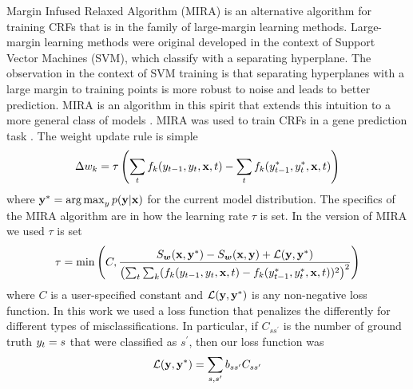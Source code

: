 Margin Infused Relaxed Algorithm (MIRA) is an alternative algorithm for training CRFs that is in the family of large-margin learning methods. Large-margin learning methods were original developed in the context of Support Vector Machines (SVM), which classify with a separating hyperplane. The observation in the context of SVM training is that separating hyperplanes with a large margin to training points is more robust to noise and leads to better prediction. MIRA is an algorithm in this spirit that extends this intuition to a more general class of models \citep{crammerThesis}. MIRA was used to train CRFs in a gene prediction task \citep{bernal2007}. The weight update rule is simple
\begin{align*}
\Delta w_k = \tau \left(\sum_{t} f_k(y_{t-1}, y_{t}, \mathbf{x}, t) - \sum_{t} f_k(y^*_{t-1}, y^*_{t}, \mathbf{x}, t)\right)
\end{align*}
where $\mathbf{y}^* = \operatorname*{arg\,max}_{y} p(\mathbf{y}|\mathbf{x})$ for the current model distribution. The specifics of the MIRA algorithm are in how the learning rate $\tau$ is set. In the version of MIRA we used $\tau$ is set
\begin{align*}
\tau = \min\left(C, \frac{S_{\bm{w}}(\mathbf{x}, \mathbf{y}^*) - S_{\bm{w}}(\mathbf{x}, \mathbf{y}) + \mathcal{L}(\mathbf{y}, \mathbf{y}^*)}{\left(\sum_{t} \sum_k (f_k(y_{t-1}, y_{t}, \mathbf{x}, t) - f_k(y^*_{t-1}, y^*_{t}, \mathbf{x}, t))^2 \right)^2}\right)
\end{align*}
where $C$ is a user-specified constant and $\mathcal{L}(\mathbf{y}, \mathbf{y}^*)$ is any non-negative loss function. In this work we used a loss function that penalizes the differently for different types of misclassifications. In particular, if $C_{ss^{\prime}}$ is the number of ground truth $y_{t} = s$ that were classified as $s^{\prime}$, then our loss function was
\begin{align*}
\mathcal{L}(\mathbf{y}, \mathbf{y}^*) = \sum_{s, s^{\prime}} b_{ss^{\prime}} C_{ss^{\prime}}
\end{align*}
%
%
